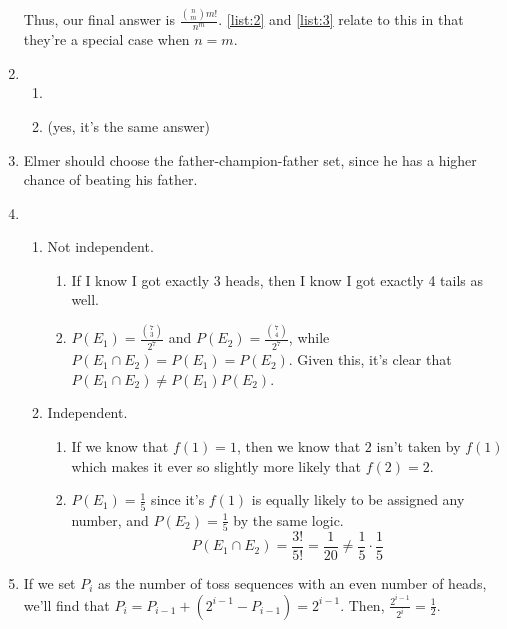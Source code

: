\documentclass[12pt]{article}
\begin{document}
\begin{enumerate}
          Thus, our final answer is $\boxed{\frac{\binom{n}{m}m!}{n^m}}$.
          \ref{list:2} and \ref{list:3} relate to this in that they're a special case when $n=m$.
    \item \begin{enumerate}
              \item {}
              \item {} (yes, it's the same answer)
          \end{enumerate}
    \item Elmer should choose the father-champion-father set, since he has a higher chance of beating his father.
    \item \begin{enumerate}
              \item Not independent.
                    \begin{enumerate}
                        \item If I know I got exactly 3 heads, then I know I got exactly 4 tails as well.
                        \item $P(E_1)=\frac{\binom{7}{3}}{2^7}$ and $P(E_2)=\frac{\binom{7}{4}}{2^7}$, while $P(E_1 \cap E_2)=P(E_1)=P(E_2)$.
                              Given this, it's clear that $P(E_1 \cap E_2) \ne P(E_1)P(E_2)$.
                    \end{enumerate}
              \item Independent.
                    \begin{enumerate}
                        \item If we know that $f(1)=1$, then we know that $2$ isn't taken by $f(1)$ which makes
                              it ever so slightly more likely that $f(2)=2$.
                        \item $P(E_1)=\frac{1}{5}$ since it's $f(1)$ is equally likely to be assigned any number,
                              and $P(E_2)=\frac{1}{5}$ by the same logic.
                              \[P(E_1 \cap E_2)=\frac{3!}{5!}=\frac{1}{20} \ne \frac{1}{5} \cdot \frac{1}{5}\]
                    \end{enumerate}
          \end{enumerate}
    \item If we set $P_i$ as the number of toss sequences with an even number of heads,
          we'll find that $P_i=P_{i-1}+(2^{i-1}-P_{i-1})=2^{i-1}$.
          Then, $\frac{2^{i-1}}{2^i}=\boxed{\frac{1}{2}}$.
\end{enumerate}
\end{document}
